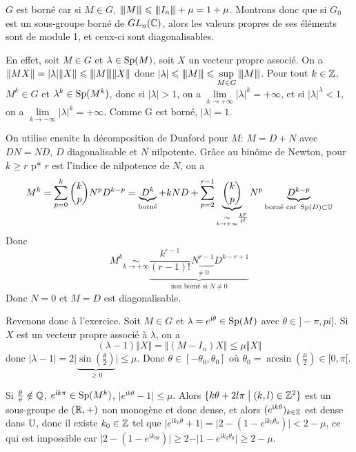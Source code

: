 \begin{solution}
	$G$ est borné car si $M\in G$, ${\left\vert\kern-0.25ex\left\vert\kern-0.25ex\left\vert{}M \right\vert\kern-0.25ex\right\vert\kern-0.25ex\right\vert}\leqslant {\left\vert\kern-0.25ex\left\vert\kern-0.25ex\left\vert{}I_{n} \right\vert\kern-0.25ex\right\vert\kern-0.25ex\right\vert}+\mu=1+\mu$. Montrons donc que si $G_{0}$ est un sous-groupe borné de $GL_{n}(\mathbb{C})$, alors les valeurs propres de ses éléments sont de module 1, et ceux-ci sont diagonalisables.

	En effet, soit $M\in G$ et $\lambda\in\operatorname{Sp}(M)$, soit $X$ un vecteur propre associé. On a 
	$\Vert MX\Vert=\vert\lambda\vert\Vert X\Vert\leqslant{\left\vert\kern-0.25ex\left\vert\kern-0.25ex\left\vert{}M \right\vert\kern-0.25ex\right\vert\kern-0.25ex\right\vert}\Vert X\Vert$ donc $\vert\lambda\vert\leqslant{\left\vert\kern-0.25ex\left\vert\kern-0.25ex\left\vert{}M \right\vert\kern-0.25ex\right\vert\kern-0.25ex\right\vert}\leqslant\sup\limits_{M\in G}{\left\vert\kern-0.25ex\left\vert\kern-0.25ex\left\vert{}M \right\vert\kern-0.25ex\right\vert\kern-0.25ex\right\vert}$. Pour tout $k\in\mathbb{Z}$, $M^{k}\in G$ et $\lambda^{k}\in\operatorname{Sp}(M^{k})$, donc si $\vert\lambda\vert>1$, on a $\lim\limits_{k\to+\infty}\vert\lambda\vert^{k}=+\infty$, et si $\vert\lambda\vert^{\lambda}<1$, on a $\lim\limits_{k\to-\infty}\vert\lambda\vert^{k}=+\infty$. Comme 
	G est borné, $\vert\lambda\vert=1$.

	On utilise ensuite la décomposition de Dunford pour $M$: $M=D+N$ avec $DN=ND$, $D$ diagonalisable et $N$ nilpotente. Grâce au binôme de Newton, pour $k\geqslant r$ p* $r$ est l'indice de nilpotence de $N$, on a
	$$M^{k}=\sum_{p=0}^{k}\binom{k}{p}N^{p}D^{k-p}=\underbrace{D^{k}}_{\text{borné}}+kND+\sum_{p=2}^{r-1}\underbrace{\binom{k}{p}}_{\underset{k\to+\infty}{\sim}\frac{k^{p}}{p!}}N^{p}\underbrace{D^{k-p}}_{\text{borné car }\operatorname{Sp}(D)\subset\mathbb{U}}$$
	Donc
	$$M^{k}\underset{k\to+\infty}{\sim}\underbrace{\frac{k^{r-1}}{(r-1)!}\underbrace{N^{r-1}}_{\neq0}D^{k-r+1}}_{\text{non borné si }N\neq0}$$
	Donc $N=0$ et $M=D$ est diagonalisable.

	Revenons donc à l'exercice. Soit $M\in G$ et $\lambda=e^{\mathrm{i}\theta}\in\operatorname{Sp}(M)$ avec $\theta\in]-\pi,pi]$. Si $X$ est un vecteur propre associé à $\lambda$, on a 
	$$(\lambda-1)\Vert X\Vert=\Vert(M-I_{n})X\Vert\leqslant\mu\Vert X\Vert$$
	donc $\vert\lambda-1\vert=2\vert\underbrace{\sin(\frac{\theta}{2})}_{\geqslant0}\vert\leqslant\mu$.
	Donc $\theta\in[-\theta_{0},\theta_{0}]$ où $\theta_{0}=\arcsin(\frac{\mu}{2})\in[0,\pi[$.

	Si $\frac{\theta}{\pi}\notin\mathbb{Q}$, $e^{\mathrm{i}k\pi}\in\operatorname{Sp}(M^{k})$, $\vert e^{\mathrm{i}k\theta}-1\vert\leqslant\mu$. Alors $\{k\theta+2l\pi\bigm| (k,l)\in\mathbb{Z}^{2}\}$ est un sous-groupe de $(\mathbb{R},+)$ non monogène et donc dense, et alors $(e^{\mathrm{i}k\theta})_{k\in\mathbb{Z}}$ est dense dans $\mathbb{U}$, donc il existe $k_{0}\in\mathbb{Z}$ tel que $\vert e^{\mathrm{i}k_{0}\theta}+1\vert=\vert 2-(1-e^{\mathrm{i}k_{0}\theta_{0}})\vert<2-\mu$, ce qui est impossible car $\vert 2-(1-e^{\mathrm{i}k_{0\theta}})\vert\geqslant2-\vert 1-e^{\mathrm{i}k_{0}\theta_{0}}\vert\geqslant2-\mu$.


\end{solution}
